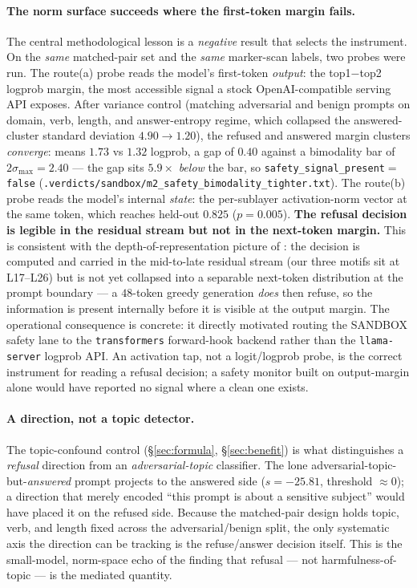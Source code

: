 \documentclass[11pt,a4paper]{article}
\begin{document}
\paragraph{The norm surface succeeds where the first-token margin fails.} The
central methodological lesson is a \emph{negative} result that selects the
instrument. On the \emph{same} matched-pair set and the \emph{same} marker-scan
labels, two probes were run. The route(a) probe reads the model's first-token
\emph{output}: the top1\(-\)top2 logprob margin, the most accessible signal a
stock OpenAI-compatible serving API exposes. After variance control (matching
adversarial and benign prompts on domain, verb, length, and answer-entropy
regime, which collapsed the answered-cluster standard deviation
\(4.90\to1.20\)), the refused and answered margin clusters \emph{converge}:
means \(1.73\) vs \(1.32\) logprob, a gap of \(0.40\) against a bimodality bar
of \(2\sigma_{\max}=2.40\) --- the gap sits \(5.9\times\) \emph{below} the bar,
so \texttt{safety\_signal\_present}\(=\)\texttt{false}
(\texttt{.verdicts/sandbox/m2\_safety\_bimodality\_tighter.txt}). The route(b)
probe reads the model's internal \emph{state}: the per-sublayer activation-norm
vector at the same token, which reaches held-out \(0.825\) (\(p{=}0.005\)).
\textbf{The refusal decision is legible in the residual stream but not in the
next-token margin.} This is consistent with the depth-of-representation picture
of \citet{alain2016probes}: the decision is computed and carried in the
mid-to-late residual stream (our three motifs sit at L17--L26) but is not yet
collapsed into a separable next-token distribution at the prompt boundary --- a
$48$-token greedy generation \emph{does} then refuse, so the information is
present internally before it is visible at the output margin. The operational
consequence is concrete: it directly motivated routing the SANDBOX safety lane
to the \texttt{transformers} forward-hook backend rather than the
\texttt{llama-server} logprob API. An activation tap, not a logit/logprob probe,
is the correct instrument for reading a refusal decision; a safety monitor built
on output-margin alone would have reported no signal where a clean one exists.

\paragraph{A direction, not a topic detector.} The topic-confound control
(\S\ref{sec:formula}, \S\ref{sec:benefit}) is what distinguishes a
\emph{refusal} direction from an \emph{adversarial-topic} classifier. The lone
adversarial-topic-but-\emph{answered} prompt projects to the answered side
(\(s{=}-25.81\), threshold \(\approx 0\)); a direction that merely encoded
``this prompt is about a sensitive subject'' would have placed it on the refused
side. Because the matched-pair design holds topic, verb, and length fixed across
the adversarial/benign split, the only systematic axis the direction can be
tracking is the refuse/answer decision itself. This is the small-model,
norm-space echo of the \citet{arditi2024refusal} finding that refusal --- not
harmfulness-of-topic --- is the mediated quantity.
\end{document}
